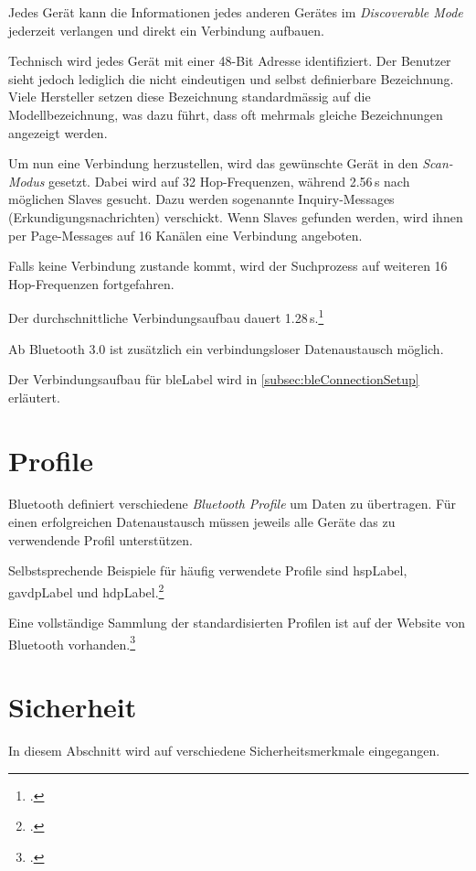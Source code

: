 Jedes Gerät kann die Informationen jedes anderen Gerätes im \textit{Discoverable Mode} jederzeit verlangen und direkt ein Verbindung aufbauen.

Technisch wird jedes Gerät mit einer 48-Bit Adresse identifiziert. Der Benutzer sieht jedoch lediglich die nicht eindeutigen und selbst definierbare Bezeichnung. Viele Hersteller setzen diese Bezeichnung standardmässig auf die Modellbezeichnung, was dazu führt, dass oft mehrmals gleiche Bezeichnungen angezeigt werden.

Um nun eine Verbindung herzustellen, wird das gewünschte Gerät in den \textit{Scan-Modus} gesetzt.
Dabei wird auf 32 Hop-Frequenzen, während 2.56\,s nach möglichen Slaves gesucht. Dazu werden sogenannte Inquiry-Messages (Erkundigungsnachrichten) verschickt.
Wenn Slaves gefunden werden, wird ihnen per Page-Messages auf 16 Kanälen eine Verbindung angeboten.

Falls keine Verbindung zustande kommt, wird der Suchprozess auf weiteren 16 Hop-Frequenzen fortgefahren.

Der durchschnittliche Verbindungsaufbau dauert 1.28\,s.\footcite{Bluetooth_de_Wikipedia_2015-04-18}

Ab Bluetooth 3.0 ist zusätzlich ein verbindungsloser Datenaustausch möglich.

Der Verbindungsaufbau für \gls{bleLabel} wird in \cref{subsec:bleConnectionSetup} erläutert.

\section{Profile}
Bluetooth definiert verschiedene \textit{Bluetooth Profile} um Daten zu übertragen.
Für einen erfolgreichen Datenaustausch müssen jeweils alle Geräte das zu verwendende Profil unterstützen.

Selbstsprechende Beispiele für häufig verwendete Profile sind \gls{hspLabel}, \gls{gavdpLabel} und  \gls{hdpLabel}.\footcite{List_of_Bluetooth_profiles_Wikipedia_2015-04-27}

Eine vollständige Sammlung der standardisierten Profilen ist auf der Website von Bluetooth vorhanden.\footcite{Profiles_Overview_Bluetooth_Development_Portal_2015-04-27}


\section{Sicherheit}
In diesem Abschnitt wird auf verschiedene Sicherheitsmerkmale eingegangen.

